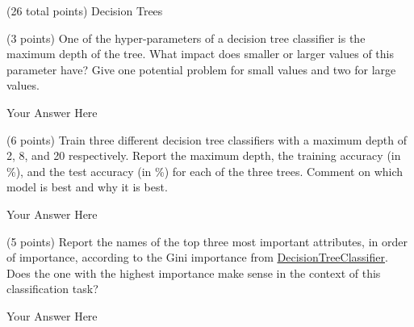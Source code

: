\documentclass[12pt]{article}
\begin{document}
\begin{question}{(26 total points) Decision Trees}
\begin{subquestion}
\end{subquestion}


%
%
\begin{subquestion}{(3 points) 
One of the hyper-parameters of a decision tree classifier is the maximum depth of the tree. 
What impact does smaller or larger values of this parameter have? Give one potential problem for small values and two for large values. 
}


\begin{answerbox}{10em}
Your Answer Here
\end{answerbox}



\end{subquestion}


%
%
\begin{subquestion}{(6 points) 
Train three different decision tree classifiers with a maximum depth of 2, 8, and 20 respectively.
Report the maximum depth, the training accuracy (in \%), and the test accuracy (in \%) for each of the three trees.
Comment on which model is best and why it is best. \\
}


\begin{answerbox}{20em}
Your Answer Here
\end{answerbox}



\end{subquestion}


%
%
\begin{subquestion}{(5 points) 
Report the names of the top three most important attributes, in order of importance, according to the Gini importance from \href{https://scikit-learn.org/0.19/modules/generated/sklearn.tree.DecisionTreeClassifier.html}{DecisionTreeClassifier}. 
Does the one with the highest importance make sense in the context of this classification task? \\
}


\begin{answerbox}{10em}
Your Answer Here
\end{answerbox}




\end{subquestion}
\end{question}
\end{document}
